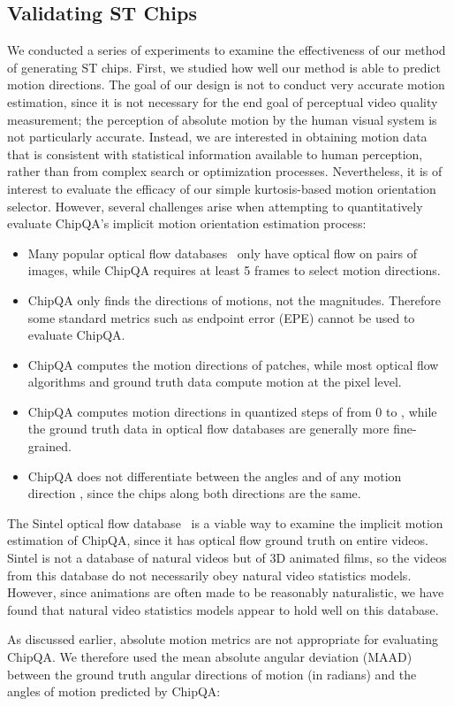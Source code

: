\documentclass[journal]{IEEEtran}
\begin{document}
\subsection{Validating ST Chips}
We conducted a series of experiments to examine the effectiveness of our method of generating ST chips. First, we studied how well our method is able to predict motion directions. The goal of our design is not to conduct very accurate motion estimation, since it is not necessary for the end goal of perceptual video quality measurement; the perception of absolute motion by the human visual system is not particularly accurate. Instead, we are interested in obtaining motion data that is consistent with statistical information available to human perception, rather than from complex search or optimization processes. Nevertheless, it is of interest to evaluate the efficacy of our simple kurtosis-based motion orientation selector. However, several challenges arise when attempting to quantitatively evaluate ChipQA's implicit motion orientation estimation process:
\begin{itemize}
    \item Many popular optical flow databases~\cite{middlebury,flyingchairs,kitti} only have optical flow on pairs of images, while ChipQA requires at least 5 frames to select motion directions.
    \item ChipQA only finds the directions of motions, not the magnitudes. Therefore some standard metrics such as endpoint error (EPE) cannot be used to evaluate ChipQA. 
    \item ChipQA computes the motion directions of patches, while most optical flow algorithms and ground truth data compute motion at the pixel level.
    \item ChipQA computes motion directions in quantized steps of  from 0 to , while the ground truth data in optical flow databases are generally more fine-grained.
    \item ChipQA does not differentiate between the angles  and  of any motion direction , since the chips along both directions are the same.
\end{itemize}
The Sintel optical flow database~\cite{sintel} is a viable way to examine the implicit motion estimation of ChipQA, since it has optical flow ground truth on entire videos. Sintel is not a database of natural videos but of 3D animated films, so the videos from this database do not necessarily obey natural video statistics models. However, since animations are often made to be reasonably naturalistic, we have found that  natural video statistics models appear to hold well on this database. \par
As discussed earlier, absolute motion metrics are not appropriate for evaluating ChipQA. We therefore used the mean absolute angular deviation (MAAD) between the ground truth angular directions of motion  (in radians) and the angles of motion  predicted by ChipQA:
\end{document}
